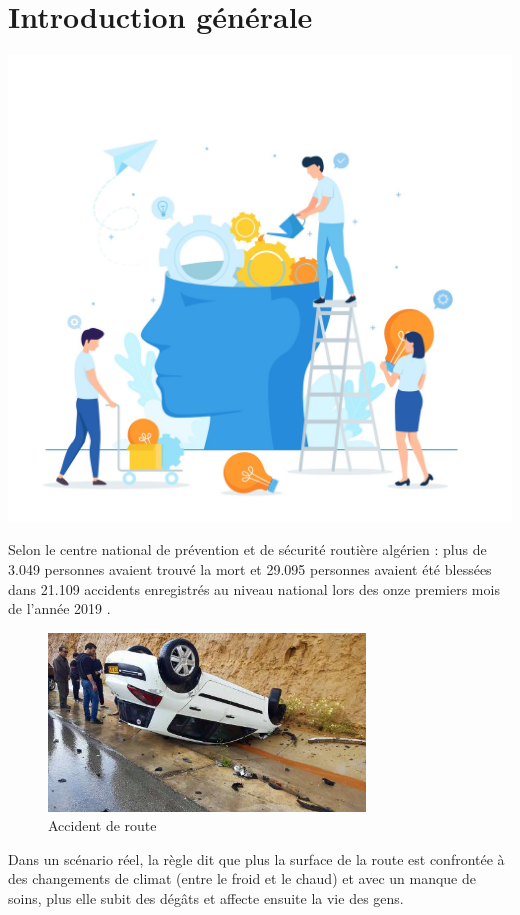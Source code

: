 \chapter*{Introduction générale}
\renewcommand{\thesection}{\arabic{section}}
		



\label{chapitre1}
		
		\includegraphics [width=1 \linewidth, height=0.8\textheight, keepaspectratio] {Images/chapterFigures/chOne.png}
		
	
		
    \newpage
    \thispagestyle{plain}
Selon le centre national de prévention et de sécurité routière algérien :
plus de 3.049 personnes avaient trouvé la mort et 29.095 personnes avaient été blessées
dans 21.109 accidents enregistrés au niveau national lors des onze premiers mois de l'année 2019  \cite{nassimaAccidentsRouteAlger}.
\begin{figure}[h!]
  \center
  \includegraphics[width=0.75\textwidth]{Images/chapter1/accident.jpg}
  \caption{Accident de route}
  \label{fig:Accident}
\end{figure}
Dans un scénario réel, la règle dit que plus la surface de la route est confrontée
à des changements de climat (entre le froid et le chaud) et avec un manque de soins,
plus elle subit des dégâts et affecte ensuite la vie des gens.

